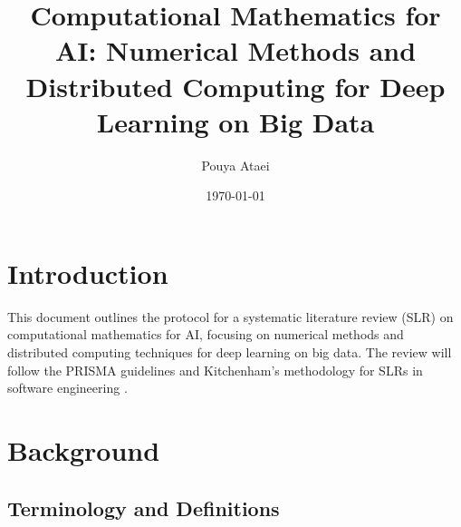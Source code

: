 \documentclass[format=acmsmall, natbib=true, citestyle=acmauthoryear]{acmart}
\title{Computational Mathematics for AI: Numerical Methods and Distributed Computing for Deep Learning on Big Data}
\author{Pouya Ataei}
\date{\today}
\begin{document}
\maketitle

\section{Introduction}\label{sec:introduction}
This document outlines the protocol for a systematic literature review (SLR) on computational mathematics for AI, focusing on numerical methods and distributed computing techniques for deep learning on big data. The review will follow the PRISMA guidelines \citep{moher2009preferred} and Kitchenham's methodology for SLRs in software engineering \citep{kitchenham2007guidelines}.


\section{Background}\label{sec:background}

\subsection{Terminology and Definitions}\label{subsec:terminology-and-definitions}
\end{document}
